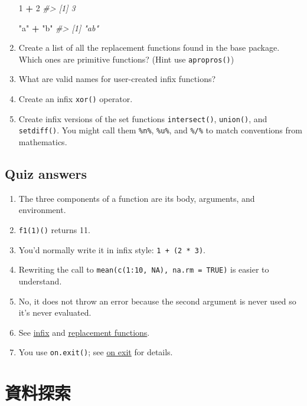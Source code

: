 \documentclass[]{book}
\newenvironment{Shaded}{\begin{snugshade}}{\end{snugshade}}
\newcommand{\CommentTok}[1]{\textcolor[rgb]{0.56,0.35,0.01}{\textit{#1}}}
\newcommand{\DecValTok}[1]{\textcolor[rgb]{0.00,0.00,0.81}{#1}}
\newcommand{\OperatorTok}[1]{\textcolor[rgb]{0.81,0.36,0.00}{\textbf{#1}}}
\newcommand{\StringTok}[1]{\textcolor[rgb]{0.31,0.60,0.02}{#1}}
\theoremstyle{definition}
\theoremstyle{definition}
\theoremstyle{definition}
\theoremstyle{remark}
\begin{document}
\begin{enumerate}
\begin{Shaded}
\begin{Highlighting}[]
\DecValTok{1} \OperatorTok{+}\StringTok{ }\DecValTok{2}
\CommentTok{#> [1] 3}

\StringTok{"a"} \OperatorTok{+}\StringTok{ "b"}
\CommentTok{#> [1] "ab"}
\end{Highlighting}
\end{Shaded}
\item
  Create a list of all the replacement functions found in the base
  package. Which ones are primitive functions? (Hint use
  \texttt{apropros()})
\item
  What are valid names for user-created infix functions?
\item
  Create an infix \texttt{xor()} operator.
\item
  Create infix versions of the set functions \texttt{intersect()},
  \texttt{union()}, and \texttt{setdiff()}. You might call them
  \texttt{\%n\%}, \texttt{\%u\%}, and \texttt{\%/\%} to match
  conventions from mathematics.
\end{enumerate}

\hypertarget{function-answers}{%
\section{Quiz answers}\label{function-answers}}

\begin{enumerate}
\def\labelenumi{\arabic{enumi}.}
\item
  The three components of a function are its body, arguments, and
  environment.
\item
  \texttt{f1(1)()} returns 11.
\item
  You'd normally write it in infix style: \texttt{1\ +\ (2\ *\ 3)}.
\item
  Rewriting the call to \texttt{mean(c(1:10,\ NA),\ na.rm\ =\ TRUE)} is
  easier to understand.
\item
  No, it does not throw an error because the second argument is never
  used so it's never evaluated.
\item
  See \protect\hyperlink{infix-functions}{infix} and
  \protect\hyperlink{replacement-functions}{replacement functions}.
\item
  You use \texttt{on.exit()}; see \protect\hyperlink{on-exit}{on exit}
  for details.
\end{enumerate}

\chapter{資料探索}
\end{document}
